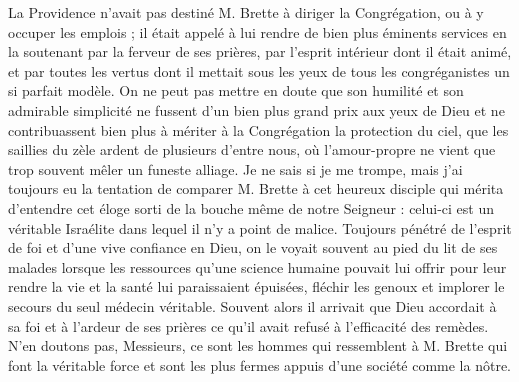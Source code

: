 La Providence n'avait pas destiné M. Brette à diriger la Congrégation, ou à y occuper les emplois ; il était appelé à lui rendre de bien plus éminents services en la soutenant par la ferveur de ses prières, par l'esprit intérieur dont il était animé, et par toutes les vertus dont il mettait sous les yeux de tous les congréganistes un si parfait modèle. On ne peut pas mettre en doute que son humilité et son admirable simplicité ne fussent d'un bien plus grand prix aux yeux de Dieu et ne contribuassent bien plus à mériter à la Congrégation la protection du ciel, que les saillies du zèle ardent de plusieurs d'entre nous, où l'amour-propre ne vient que trop souvent mêler un funeste alliage. Je ne sais si je me trompe, mais j'ai toujours eu la tentation de comparer M. Brette à cet heureux disciple qui mérita d'entendre cet éloge sorti de la bouche même de notre Seigneur : celui-ci est un véritable Israélite dans lequel il n'y a point de malice. Toujours pénétré de l'esprit de foi et d'une vive confiance en Dieu, on le voyait souvent au pied du lit de ses malades lorsque les ressources qu'une science humaine pouvait lui offrir pour leur rendre la vie et la santé lui paraissaient épuisées, fléchir les genoux et implorer le secours du seul médecin véritable. Souvent alors il arrivait que Dieu accordait à sa foi et à l'ardeur de ses prières ce qu'il avait refusé à l'efficacité des remèdes. N'en doutons pas, Messieurs, ce sont les hommes qui ressemblent à M. Brette qui font la véritable force et sont les plus fermes appuis d'une société comme la nôtre.

